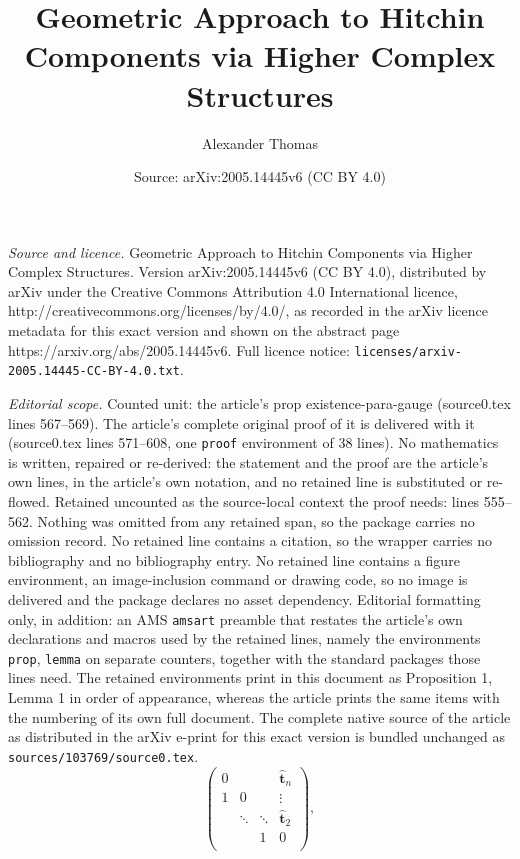 \documentclass[10pt,a4paper]{amsart}
\title{Geometric Approach to Hitchin Components via Higher Complex Structures}
\author{Alexander Thomas}
\date{Source: arXiv:2005.14445v6 (CC BY 4.0)}
\begin{document}
\maketitle

\noindent\emph{Source and licence.} Geometric Approach to Hitchin Components via Higher Complex Structures. Version arXiv:2005.14445v6 (CC BY 4.0), distributed by arXiv under the Creative Commons Attribution 4.0 International licence, http://creativecommons.org/licenses/by/4.0/, as recorded in the arXiv licence metadata for this exact version and shown on the abstract page https://arxiv.org/abs/2005.14445v6. Full licence notice: \texttt{licenses/arxiv-2005.14445-CC-BY-4.0.txt}.\par\smallskip

\noindent\textit{Editorial scope.} Counted unit: the article's prop existence-para-gauge (source0.tex lines 567--569). The article's complete original proof of it is delivered with it (source0.tex lines 571--608, one \texttt{proof} environment of 38 lines). No mathematics is written, repaired or re-derived: the statement and the proof are the article's own lines, in the article's own notation, and no retained line is substituted or re-flowed.  Retained uncounted as the source-local context the proof needs: lines 555--562.  Nothing was omitted from any retained span, so the package carries no omission record.  No retained line contains a citation, so the wrapper carries no bibliography and no bibliography entry.  No retained line contains a figure environment, an image-inclusion command or drawing code, so no image is delivered and the package declares no asset dependency.  Editorial formatting only, in addition: an AMS \texttt{amsart} preamble that restates the article's own declarations and macros used by the retained lines, namely the environments \texttt{prop}, \texttt{lemma} on separate counters, together with the standard packages those lines need.  The retained environments print in this document as Proposition 1, Lemma 1 in order of appearance, whereas the article prints the same items with the numbering of its own full document.  The complete native source of the article as distributed in the arXiv e-print for this exact version is bundled unchanged as \texttt{sources/103769/source0.tex}.
\begin{equation}\label{firstmatrix}
\begin{pmatrix} 
0&  &  & \bm\hat{t}_n\\
1 &0   &  &\vdots \\
& \ddots &\ddots &\bm\hat{t}_2 \\
 &  & 1 & 0 \\
\end{pmatrix},
\end{equation}
\end{document}
